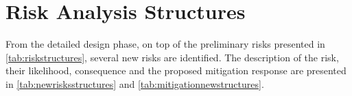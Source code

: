 










\section{Risk Analysis Structures}
\label{sec:strucriskanalysis}
From the detailed design phase, on top of the preliminary risks presented in \autoref{tab:riskstructures}, several new risks are identified. The description of the risk, their likelihood, consequence and the proposed mitigation response are presented in \autoref{tab:newrisksstructures} and \autoref{tab:mitigationnewstructures}.
